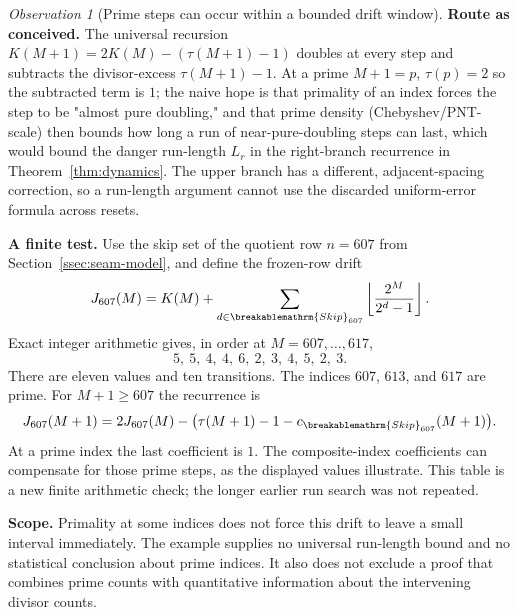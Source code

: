 \documentclass[11pt]{article}
\theoremstyle{plain}
\theoremstyle{definition}
\theoremstyle{remark}
\newtheorem{obs}[thm]{Observation}
\renewcommand{\mathrm}[1]{\ifmmode\breakablemathrm{#1}\else\textrm{#1}\fi}%
\begin{document}
\begin{obs}[Prime steps can occur within a bounded drift window]
\label{obs:prime-doubling}
\textbf{Route as conceived.} The universal recursion $K(M+1) = 2K(M) - (\tau(M+1)-1)$ doubles at every step and subtracts the divisor-excess $\tau(M+1)-1$. At a prime $M+1=p$,
$\tau(p)=2$ so the subtracted term is $1$; the naive hope is that primality of an index forces the
step to be "almost pure doubling," and that prime density (Chebyshev/PNT-scale) then bounds how
long a run of near-pure-doubling steps can last, which would bound the danger run-length $L_r$ in
the right-branch recurrence in Theorem~\ref{thm:dynamics}.
The upper branch has a different, adjacent-spacing correction, so
a run-length argument cannot use the discarded uniform-error
formula across resets.

\textbf{A finite test.} Use the skip set of the quotient row $n=607$
from Section~\ref{ssec:seam-model}, and define the frozen-row drift
\[
 J_{607}(M)=K(M)+\sum_{d\in\mathrm{Skip}_{607}}
                   \left\lfloor\frac{2^M}{2^d-1}\right\rfloor.
\]
Exact integer arithmetic gives, in order at $M=607,\ldots,617$,
\[
 5,\ 5,\ 4,\ 4,\ 6,\ 2,\ 3,\ 4,\ 5,\ 2,\ 3.
\]
There are eleven values and ten transitions.  The indices $607$, $613$,
and $617$ are prime.  For $M+1\ge607$ the recurrence is
\[
 J_{607}(M+1)=2J_{607}(M)
 -\bigl(\tau(M+1)-1-c_{\mathrm{Skip}_{607}}(M+1)\bigr).
\]
At a prime index the last coefficient is $1$.  The composite-index
coefficients can compensate for those prime steps, as the displayed
values illustrate.  This table is a new finite arithmetic check; the
longer earlier run search was not repeated.

\textbf{Scope.} Primality at some indices does not force this drift to
leave a small interval immediately.  The example supplies no universal
run-length bound and no statistical conclusion about prime indices.
It also does not exclude a proof that combines prime counts with
quantitative information about the intervening divisor counts.
\end{obs}
\end{document}
